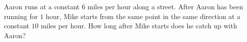 Aaron runs at a constant $6$ miles per hour along a street. After Aaron has been running for $1$ hour, Mike starts from the same point in the same direction at a constant $10$ miles per hour. How long after Mike starts does he catch up with Aaron?
